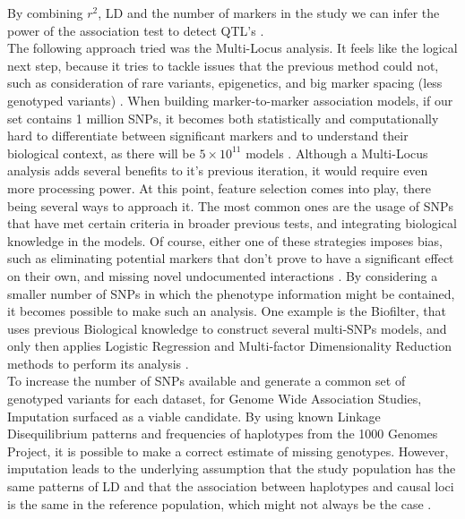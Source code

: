 By combining $r^2$, LD and the number of markers in the study we can infer the power of the association test to detect QTL's \cite{hill1968linkage,visscher201710}. \\
The following approach tried was the Multi-Locus analysis. It feels like the logical next step, because it tries to tackle issues that the previous method could not, such as consideration of rare variants, epigenetics, and big marker spacing (less genotyped variants) \cite{mooney2012ga}. When building marker-to-marker association models, if our set contains 1 million SNPs, it becomes both statistically and computationally hard to differentiate between significant markers and to understand their biological context, as there will be $5\times10^{11}$ models \cite{turner2011knowledge}. Although a Multi-Locus analysis adds several benefits to it's previous iteration, it  would require even more processing power. At this point, feature selection comes into play, there being several ways to approach it. The most common ones are the usage of SNPs that have met certain criteria in broader previous tests, and integrating biological knowledge in the models. Of course, either one of these strategies imposes bias, such as eliminating potential markers that don't prove to have a significant effect on their own, and missing novel undocumented interactions \cite{carlson2004mapping}. By considering a smaller number of SNPs in which the phenotype information might be contained, it becomes possible to make such an analysis. One example is the Biofilter, that uses previous Biological knowledge to construct several multi-SNPs models, and only then applies Logistic Regression and Multi-factor Dimensionality Reduction methods to perform its analysis \cite{bush2012genome,bush2009biofilter}.\\
To increase the number of SNPs available and generate a common set of genotyped variants for each dataset, for Genome Wide Association Studies, Imputation surfaced as a viable candidate. By using known Linkage Disequilibrium patterns and frequencies of haplotypes from the 1000 Genomes Project, it is possible to make a correct estimate of missing genotypes. However, imputation leads to the underlying assumption that the study population has the same patterns of LD and that the association between haplotypes and causal loci is the same in the reference population, which might not always be the case \cite{10002012integrated, bush2012genome}.

